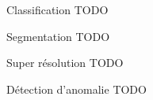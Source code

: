 \begin{frame}{Classification}
    \alert{TODO}
\end{frame}

\begin{frame}{Segmentation}
    \alert{TODO}
\end{frame}
  
\begin{frame}{Super résolution}
    \alert{TODO}
\end{frame}

\begin{frame}{Détection d'anomalie}
    \alert{TODO}
\end{frame}
